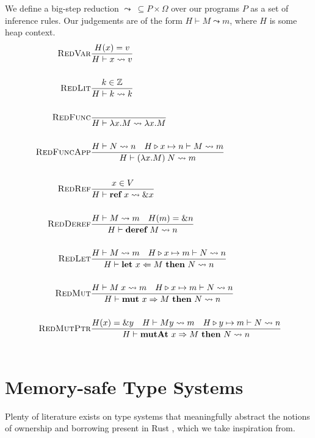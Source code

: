 \documentclass{article}
\newcommand{\agap}{\hspace{0.25em}}
\newcommand{\mkref}{\textbf{ref}~}
\newcommand{\deref}{\textbf{deref}~}%
\newcommand{\mutate}[3]{\textbf{mut}~ #1 \Rightarrow #2 ~\textbf{then}~ #3}
\newcommand{\mutptr}[3]{\textbf{mutAt}~ #1 \Rightarrow #2 ~\textbf{then}~ #3}
\newcommand{\letvar}[3]{\textbf{let}~ #1 \Leftarrow #2 ~\textbf{then}~ #3}
\newcommand{\red}{\leadsto}
\newcommand{\overwrite}{\triangleright}
\newcommand{\judge}[3]{\textsc{#1}&\frac{#2}{#3}}
\begin{document}
We define a big-step reduction $\red ~\subseteq P \times \Omega$ over our programs $P$ as a set of inference rules. Our judgements are of the form $H \vdash M \red m$, where $H$ is some heap context. 
\begin{align*}
    \judge{RedVar}{H(x) = v}{H \vdash x \red v }\\
    ~\\
    \judge{RedLit}{k \in \mathbb{Z} }{H \vdash k \red k}\\
    ~\\
    \judge{RedFunc}{}{H \vdash \lambda x . M \red \lambda x . M}\\
    ~\\
    \judge{RedFuncApp}{H \vdash N \red n \hspace{1em} H \overwrite x \mapsto n \vdash M \red m }{H \vdash (\lambda x . M) \agap N \red m}\\
    ~\\
    \judge{RedRef}{x \in V}{H \vdash \mkref x \red \&x}\\
    ~\\
    \judge{RedDeref}{H \vdash M \red m \hspace{1em} H(m) = \& n }{ H \vdash \deref M \red n }\\
    ~\\
    \judge{RedLet}{H \vdash M \red m \hspace{1em} H \overwrite x \mapsto m \vdash N \red n }{ H \vdash \letvar{x}{M}{N} \red n }\\
    ~\\
    \judge{RedMut}{H \vdash M \agap x \red m \hspace{1em} H \overwrite x \mapsto m \vdash N \red n }{ H \vdash \mutate{x}{M}{N} \red n }\\
    ~\\
    \judge{RedMutPtr}{ H(x) = \&y \hspace{1em} H \vdash M y \red m \hspace{1em}  H \overwrite y \mapsto m \vdash N \red n }{ H \vdash \mutptr{x}{M}{N} \red n }\\
    ~\\
\end{align*}

\section{Memory-safe Type Systems}

Plenty of literature exists on type systems that meaningfully abstract the notions of ownership and borrowing present in Rust \cite{marshall2022entente, marshall2024fracunique}, which we take inspiration from. 
\end{document}
